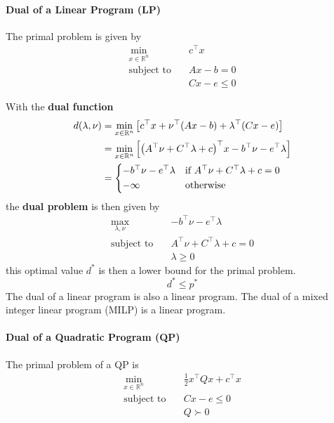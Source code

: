 \paragraph{Dual of a Linear Program (LP)}
The primal problem is given by
\begin{align*}
    \min_{x\in\mathbb{R}^n} & c^\top x    \\
    \text{subject to}\quad  & Ax-b = 0    \\
                            & Cx-e \leq 0
\end{align*}

With the \textbf{dual function}
\begin{align*}
    d(\lambda, \nu) & = \min_{x\in\mathbb{R}^n} \left[c^\top x + \nu^\top (Ax-b) + \lambda^\top(Cx-e)\right]                              \\
                    & = \min_{x\in\mathbb{R}^n} \left[{\left(A^\top\nu+C^\top\lambda+c\right)}^\top x - b^\top\nu - e^\top \lambda\right] \\
                    & =\begin{cases*}
                           -b^\top\nu - e^\top \lambda & if $A^\top\nu+ C^\top\lambda+c = 0$ \\
                           -\infty                     & otherwise
                       \end{cases*}
\end{align*}
the \textbf{dual problem} is then given by
\begin{align*}
    \max_{\lambda,\nu}     & - b^\top \nu - e^\top\lambda  \\
    \text{subject to}\quad & A^\top\nu+C^\top\lambda+c = 0 \\
                           & \lambda \geq 0
\end{align*}
this optimal value $d^*$ is then a lower bound for the primal problem.
\begin{equation*}
    d^* \leq p^*
\end{equation*}
The dual of a linear program is also a linear program.
\newpar{}
The dual of a mixed integer linear program (MILP) is a linear program.

\paragraph{Dual of a Quadratic Program (QP)}

The primal problem of a QP is
\begin{align*}
    \min_{x\in\mathbb{R}^n} & \frac{1}{2}x^\top Qx + c^\top x \\
    \text{subject to}\quad  & Cx-e \leq 0                     \\
                            & Q \succ 0
\end{align*}

